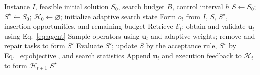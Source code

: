 \begin{algorithm}[H]
\caption{IntALNS}
\label{alg:intalns}
\begin{algorithmic}[1]
\Require Instance $I$, feasible initial solution $S_0$, search budget $B$, control interval $h$
\State $S\gets S_0$; $S^\star\gets S_0$; $\mathcal H_0\gets\varnothing$; initialize adaptive search state
  \State Form $o_t$ from $I$, $S$, $S^\star$, insertion opportunities, and remaining budget
  \State Retrieve $\mathcal E_t$; obtain and validate $\mathbf u_t$ using Eq.~\eqref{eq:agent}
    \State Sample operators using $\mathbf u_t$ and adaptive weights; remove and repair tasks to form $S'$
    \State Evaluate $S'$; update $S$ by the acceptance rule, $S^\star$ by Eq.~\eqref{eq:objective}, and search statistics
  \EndFor
  \State Append $\mathbf u_t$ and execution feedback to $\mathcal H_t$ to form $\mathcal H_{t+1}$
\EndFor
\State \Return $S^\star$
\end{algorithmic}
\end{algorithm}
